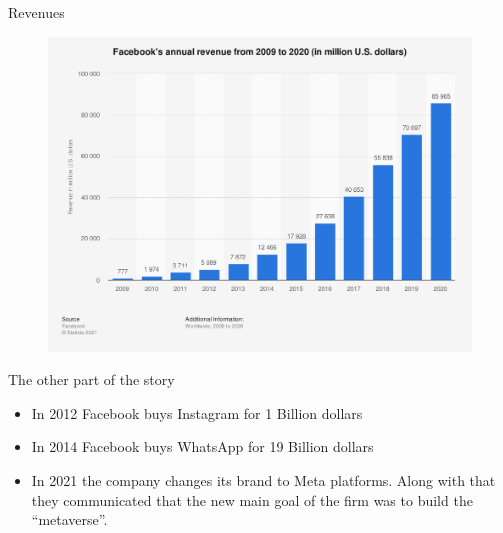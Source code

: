 \documentclass{beamer}
\begin{document}
\begin{frame}{Revenues}
  \begin{figure}
    \includegraphics[width=.8\textwidth]{images/statista_rev.png}
  \end{figure}
\end{frame}

\begin{frame}{The other part of the story}
  \begin{itemize}
  \item In 2012 Facebook buys Instagram for 1 Billion dollars
  \item In 2014 Facebook buys WhatsApp for 19 Billion dollars
  \item In 2021 the company changes its brand to Meta
    platforms. Along with that they communicated that the new main
    goal of the firm was to build the ``metaverse''.
  \end{itemize}
\end{frame}
\end{document}
